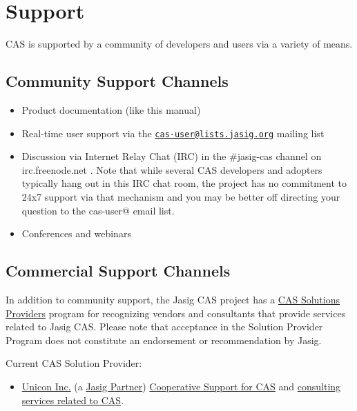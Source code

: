 \documentclass[a4paper]{book}
\begin{document}
\section{Support}

CAS is supported by a community of developers and users via a variety of means.

\subsection{Community Support Channels}

\begin{itemize}
\item
  Product documentation (like this manual)
\item
  Real-time user support via the \href{mailto:cas-user@lists.jasig.org}{\texttt{cas-user@lists.jasig.org}} mailing list
\item
  Discussion via Internet Relay Chat (IRC) in the \#jasig-cas channel on irc.freenode.net . Note that while several CAS developers and adopters typically hang out in this IRC chat room, the project has no commitment to 24x7 support via that mechanism and you may be better off directing your question to the cas-user@ email list.
\item
  Conferences and webinars
\end{itemize}
\subsection{Commercial Support Channels}

In addition to community support, the Jasig CAS project has a \href{http://www.jasig.org/cas/support/solutions-providers}{CAS Solutions Providers} program for recognizing vendors and consultants that provide services related to Jasig CAS. Please note that acceptance in the Solution Provider Program does not constitute an endorsement or recommendation by Jasig.

Current CAS Solution Provider:

\begin{itemize}
\item
  \href{http://www.unicon.net/}{Unicon Inc.} (a \href{http://www.jasig.org/jasig-membership-partners}{Jasig Partner}) \href{http://www.unicon.net/services/cas/support}{Cooperative Support for CAS} and \href{http://www.unicon.net/services/cas}{consulting services related to CAS}.
\end{itemize}
\end{document}
